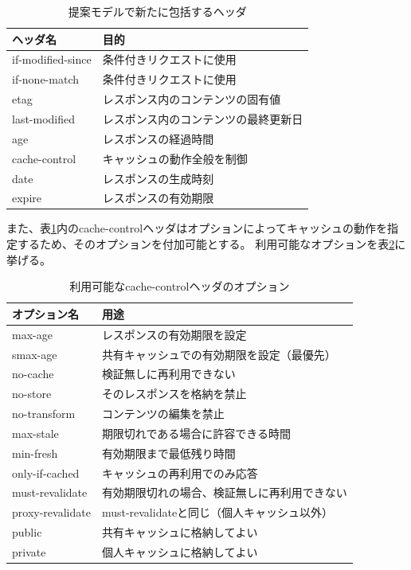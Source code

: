\documentclass[journal]{IEEEtran}
\begin{document}
\begin{table}[htb]
\centering
\caption{提案モデルで新たに包括するヘッダ}
\label{tb:ProposedModel-Headers}
\begin{tabular}{ll}
\hline
ヘッダ名 & 目的 \\
\hline
if-modified-since & 条件付きリクエストに使用 \\
if-none-match & 条件付きリクエストに使用 \\
etag & レスポンス内のコンテンツの固有値 \\
last-modified & レスポンス内のコンテンツの最終更新日 \\
age & レスポンスの経過時間 \\
cache-control & キャッシュの動作全般を制御 \\
date & レスポンスの生成時刻 \\
expire & レスポンスの有効期限 \\
\hline
\end{tabular}
\end{table}

また、表\ref{tb:ProposedModel-Headers}内のcache-controlヘッダはオプションによってキャッシュの動作を指定するため、そのオプションを付加可能とする。
利用可能なオプションを表\ref{tb:CacheControlOption}に挙げる。

\begin{table}[htb]
\centering
\caption{利用可能なcache-controlヘッダのオプション}
\label{tb:CacheControlOption}
\begin{tabular}{ll}
\hline
オプション名 & 用途 \\
\hline
max-age & レスポンスの有効期限を設定 \\
smax-age & 共有キャッシュでの有効期限を設定（最優先） \\
no-cache & 検証無しに再利用できない \\
no-store & そのレスポンスを格納を禁止 \\
no-transform & コンテンツの編集を禁止 \\
max-stale & 期限切れである場合に許容できる時間 \\
min-fresh & 有効期限まで最低残り時間 \\
only-if-cached & キャッシュの再利用でのみ応答 \\
must-revalidate & 有効期限切れの場合、検証無しに再利用できない \\
proxy-revalidate & must-revalidateと同じ（個人キャッシュ以外） \\
public & 共有キャッシュに格納してよい \\
private & 個人キャッシュに格納してよい \\
\hline
\end{tabular}
\end{table}
\end{document}
